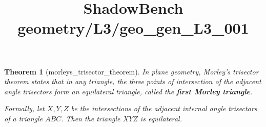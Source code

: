 \documentclass{article}
\title{ShadowBench geometry/L3/geo\_gen\_L3\_001}
\newtheorem{theorem}{Theorem}
\begin{document}
\maketitle

\begin{theorem}[morleys_trisector_theorem]\label{thm:morley_trisector}
In plane geometry, Morley's trisector theorem states that in any triangle, the three points of intersection of the adjacent angle trisectors form an equilateral triangle, called the \textbf{first Morley triangle}.

Formally, let $X, Y, Z$ be the intersections of the adjacent internal angle trisectors of a triangle $ABC$. Then the triangle $XYZ$ is equilateral.
\end{theorem}
\end{document}
